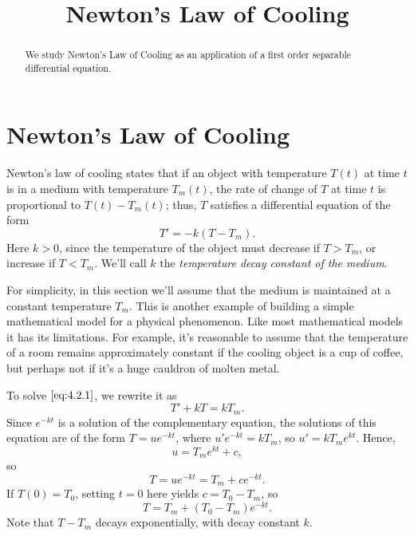 \documentclass{ximera}
\title{Newton's Law of Cooling}
\begin{document}
 
\begin{abstract}
 We study Newton's Law of Cooling as an application of a first order separable differential equation.
\end{abstract}
 
\maketitle
 
 
 
\section*{Newton's Law of Cooling}
 
Newton's law of cooling states that if an object with temperature
$T(t)$ at time $t$ is in a medium with temperature $T_m(t)$,  the
rate of change of $T$ at time $t$ is proportional to $T(t)-T_m(t)$;
thus,
$T$ satisfies a differential equation of the form
\begin{equation} \label{eq:4.2.1}
T'=-k(T-T_m).
\end{equation}
 Here $k > 0$, since the temperature of the object must decrease if
$T > T_m$, or increase if $T < T_m$.  We'll call $k$  the \textit{temperature decay constant of the medium}.
 
For simplicity, in this section we'll assume  that the medium is
maintained at a constant temperature $T_m$. This is another example of
 building a simple mathematical model for a physical
phenomenon. Like most mathematical models it has its limitations. For
example, it's reasonable to assume that the temperature of a room
remains approximately constant if the cooling object is a cup of
coffee, but perhaps not if it's a huge cauldron of molten metal.
 
 
To solve  $\eqref{eq:4.2.1}$, we rewrite it as
$$
T'+kT=kT_m.
$$
Since $e^{-kt}$ is a solution of the complementary equation, the
solutions of this equation are of the form $T=ue^{-kt}$, where
$u'e^{-kt}=kT_m$, so $u'=kT_me^{kt}$. Hence,
$$
u=T_me^{kt}+c,
$$
so
$$
T=ue^{-kt}=T_m+ce^{-kt}.
$$
If $T(0)=T_0$,  setting $t=0$ here yields $c=T_0-T_m$, so
\begin{equation} \label{eq:4.2.2}
T=T_m+(T_0-T_m)e^{-kt}.
\end{equation}
Note that $T-T_m$ decays exponentially, with decay constant $k$.
 
\end{document}
